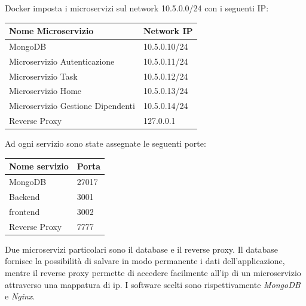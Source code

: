 \documentclass{report}
\begin{document}
Docker imposta i microservizi sul network 10.5.0.0/24 con i seguenti IP:
\begin{center} %
	\centering
	\begin{tabular}{ |p{4cm}|p{4cm}|  }
		\hline
		\centering Nome Microservizio     & \qquad\quad Network IP \\ %
		\hline
		MongoDB                           & 10.5.0.10/24           \\
		\hline
		Microservizio Autenticazione      & 10.5.0.11/24           \\
		\hline
		Microservizio Task                & 10.5.0.12/24           \\
		\hline
		Microservizio Home                & 10.5.0.13/24           \\
		\hline
		Microservizio Gestione Dipendenti & 10.5.0.14/24           \\
		\hline
		Reverse Proxy                     & 127.0.0.1              \\
		\hline
	\end{tabular}
\end{center}

Ad ogni servizio sono state assegnate le seguenti porte:

\begin{center} %
	\centering
	\begin{tabular}{ |p{4cm}|p{4cm}|  }
		\hline
		\centering Nome servizio & \qquad\qquad Porta \\ %
		\hline
		MongoDB                  & 27017              \\
		\hline
		Backend                  & 3001               \\
		\hline
		frontend                 & 3002               \\
		\hline
		Reverse Proxy            & 7777               \\
		\hline
	\end{tabular}
\end{center}

Due microservizi particolari sono il database e il reverse proxy. Il database fornisce la possibilità di salvare in modo permanente i dati dell'applicazione, mentre il reverse proxy permette di accedere facilmente all'ip di un microservizio attraverso una mappatura di ip. I software scelti sono rispettivamente \textit{MongoDB} e \textit{Nginx}.
\end{document}
